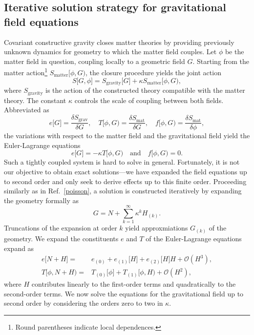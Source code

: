 \subsection{Iterative solution strategy for gravitational field equations}\label{section_iterative_solution}
Covariant constructive gravity closes matter theories by providing previously unknown dynamics for geometry to which the matter field couples. Let $\phi$ be the matter field in question, coupling locally to a geometric field $G$. Starting from the matter action\footnote{Round parentheses indicate local dependences.} $S_\text{matter}\lbrack\phi, G)$, the closure procedure yields the joint action
\begin{equation}
  S\lbrack G,\phi\rbrack = S_\text{gravity}\lbrack G\rbrack + \kappa S_\text{matter}\lbrack\phi, G),
\end{equation}
where $S_\text{gravity}$ is the action of the constructed theory compatible with the matter theory. The constant $\kappa$ controls the scale of coupling between both fields. Abbreviated as
\begin{equation}
  e\lbrack G\rbrack = \frac{\delta S_\text{grav}}{\delta G},\quad T\lbrack\phi, G) = \frac{\delta S_\text{mat}}{\delta G},\quad f\lbrack\phi,G) = \frac{\delta S_\text{mat}}{\delta \phi},
\end{equation}
the variations with respect to the matter field and the gravitational field yield the Euler-Lagrange equations
\begin{equation}\label{coupled_euler_lagrange}
  e\lbrack G\rbrack = -\kappa T\lbrack\phi, G)\quad\text{and}\quad f\lbrack\phi,G) = 0.
\end{equation}
Such a tightly coupled system is hard to solve in general. Fortunately, it is not our objective to obtain exact solutions---we have expanded the field equations up to second order and only seek to derive effects up to this finite order. Proceeding similarly as in Ref.~\ref{poisson}, a solution is constructed iteratively by expanding the geometry formally as
\begin{equation}
  G = N + \sum_{k=1}^\infty\kappa^k H_{(k)}.
\end{equation}
Truncations of the expansion at order $k$ yield approxmiations $G_{(k)}$ of the geometry. We expand the constituents $e$ and $T$ of the Euler-Lagrange equations expand as
\begin{equation}
  \begin{aligned}
    e\lbrack N + H\rbrack = {} & e_{(0)} + e_{(1)}\lbrack H\rbrack + e_{(2)}\lbrack H\rbrack H + \mathcal O(H^3), \\
    T\lbrack\phi, N + H) = {} & T_{(0)}\lbrack\phi\rbrack + T_{(1)}\lbrack\phi,H) + \mathcal O(H^2),
  \end{aligned}
\end{equation}
where $H$ contributes linearly to the first-order terms and quadratically to the second-order terms. We now solve the equations for the gravitational field up to second order by considering the orders zero to two in $\kappa$.

